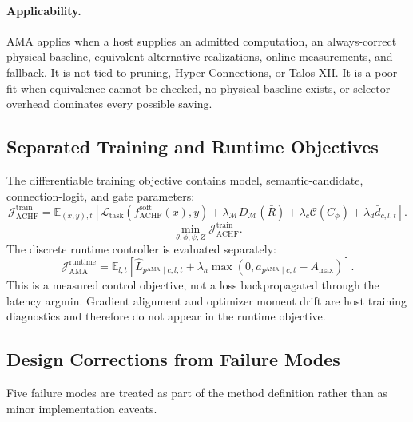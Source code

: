 \documentclass{article}
\newcommand{\ama}{\textsc{AMA}}
\begin{document}
\paragraph{Applicability.}
\ama{} applies when a host supplies an admitted computation, an always-correct
physical baseline, equivalent alternative realizations, online measurements,
and fallback. It is not tied to pruning, Hyper-Connections, or Talos-XII. It is
a poor fit when equivalence cannot be checked, no physical baseline exists, or
selector overhead dominates every possible saving.

\subsection{Separated Training and Runtime Objectives}

The differentiable training objective contains model, semantic-candidate,
connection-logit, and gate parameters:
\begin{equation}
\mathcal{J}^{\mathrm{train}}_{\mathrm{ACHF}}
=
\mathbb{E}_{(x,y),t}
\left[
\mathcal{L}_{\mathrm{task}}(f^{\mathrm{soft}}_{\mathrm{ACHF}}(x),y)
+\lambda_{\mathcal{M}}D_{\mathcal{M}}(\bar R)
+\lambda_c\mathcal{C}(C_{\phi})
+\lambda_d\bar d_{c,l,t}
\right].
\label{eq:achf-objective}
\end{equation}
\begin{equation}
\min_{\theta,\phi,\psi,Z}\mathcal{J}^{\mathrm{train}}_{\mathrm{ACHF}}.
\label{eq:achf-minimization}
\end{equation}
The discrete runtime controller is evaluated separately:
\begin{equation}
\mathcal{J}^{\mathrm{runtime}}_{\mathrm{AMA}}
=
\mathbb{E}_{l,t}
\left[
\widehat L_{p^{\mathrm{AMA}}\mid c,l,t}
+\lambda_a\max(0,a_{p^{\mathrm{AMA}}\mid c,t}-A_{\max})
\right].
\label{eq:ama-objective}
\end{equation}
This is a measured control objective, not a loss backpropagated through the
latency argmin. Gradient alignment and optimizer moment drift are host training
diagnostics and therefore do not appear in the runtime objective.

\subsection{Design Corrections from Failure Modes}

Five failure modes are treated as part of the method definition rather than as
minor implementation caveats.
\end{document}
